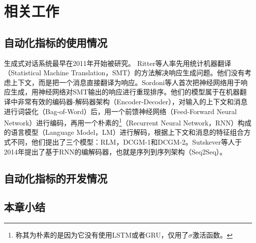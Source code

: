 
\chapter{相关工作}\label{ch:related_work}
\section{自动化指标的使用情况}
%
生成式对话系统最早在2011年开始被研究。
Ritter等人率先用统计机器翻译（Statistical Machine Translation，SMT）的方法解决响应生成问题。他们没有考虑上下文，而是把一个消息直接翻译为响应。Sordoni等人首次把神经网络用于响应生成，用神经网络对SMT输出的响应进行重现排序。他们的模型属于在机器翻译中非常有效的编码器-解码器架构（Encoder-Decoder），对输入的上下文和消息进行词袋化（Bag-of-Word）后，用一个前馈神经网络（Feed-Forward Neural Network）进行编码，再用一个朴素的\footnote{称其为朴素的是因为它没有使用LSTM或者GRU，仅用了$\sigma$激活函数。}（Recurrent Neural Network，RNN）构成的语言模型（Language Model，LM）进行解码，根据上下文和消息的特征组合方式不同，他们提出了三个模型：RLM，DCGM-1和DCGM-2。Sutskever等人于2014年提出了基于RNN的编解码器，也就是序列到序列架构（Seq2Seq）。


\section{自动化指标的开发情况}

\section{本章小结}\label{sec:本章小结}
